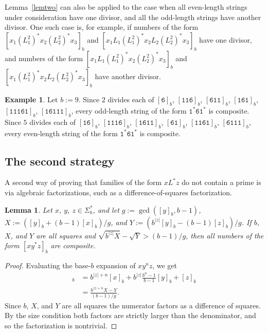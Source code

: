 \documentclass[12pt]{article}
\theoremstyle{plain}
\newtheorem{lemma}[theorem]{Lemma}
\theoremstyle{definition}
\newtheorem{example}[theorem]{Example}
\theoremstyle{remark}
\newcommand{\0}{\mathtt{0}}
\newcommand{\1}{\mathtt{1}}
\newcommand{\2}{\mathtt{2}}
\newcommand{\3}{\mathtt{3}}
\newcommand{\4}{\mathtt{4}}
\newcommand{\5}{\mathtt{5}}
\newcommand{\6}{\mathtt{6}}
\newcommand{\7}{\mathtt{7}}
\newcommand{\8}{\mathtt{8}}
\newcommand{\9}{\mathtt{9}}
\begin{document}
Lemma~\ref{lemtwo} can also be applied to the case when all even-length 
strings under consideration have one divisor, and all the odd-length 
strings have another divisor.  One such case is, for example,
if numbers of the form 
$[x_1(L_1^2)^*x_2(L_2^2)^*x_3]_b$ and $[x_1 L_1(L_1^2)^*x_2L_2(L_2^2)^*x_3]_b$ 
have one divisor, and numbers of the form $[x_1L_1(L_1^2)^*x_2(L_2^2)^*x_3]_b$ 
and $[x_1(L_1^2)^*x_2L_2(L_2^2)^*x_3]_b$ have another divisor.
\begin{example}
Let $b := 9$.
Since $2$ divides each of $[\6]_b$,
$[\1\1\6]_b$,
$[\6\1\1]_b$,
$[\1\6\1]_b$,
$[\1\1\1\6\1]_b$, 
$[\1\6\1\1\1]_b$, every odd-length string of the form $\1^*\6\1^*$ is 
composite.
Since $5$ divides each of $[\1\6]_b$,
$[\1\1\1\6]_b$,
$[\1\6\1\1]_b$,
$[\6\1]_b$,
$[\1\1\6\1]_b$, 
$[\6\1\1\1]_b$,
every even-length string of the form $\1^*\6\1^*$ is composite.
\end{example}

\subsection{The second strategy}

A second way of proving that families of the form $xL^*z$ do not contain a 
prime is via algebraic factorizations, such as a difference-of-squares 
factorization.

\begin{lemma}\label{lemsquares}
Let $x$, $y$, $z\in\Sigma^*_b$, and let $g:=\gcd([y]_b,b-1)$, 
$X:=([y]_b+(b-1)[x]_b)/g$, and $Y:=(b^{\lvert{z}\rvert}[y]_b-(b-1)[z]_b)/g$.
If\/ $b$, $X$, and $Y$ are all squares and 
$\sqrt{b^{\lvert z\rvert}X}-\sqrt{Y}>(b-1)/g$, then all numbers of the form
 $[xy^*z]_b$ are composite.
\end{lemma}
\begin{proof}
Evaluating the base-$b$ expansion of $xy^nz$, we get
\begin{align*}
[xy^nz]_b &= b^{\lvert z\rvert+n}[x]_b + b^{\lvert z\rvert}\frac{b^n-1}{b-1}[y]_b + [z]_b \\
&= \frac{b^{\lvert z\rvert+n}X-Y}{(b-1)/g} . 
\end{align*}
Since $b$, $X$, and $Y$ are all squares the numerator factors as a 
difference of squares.  By the size condition both factors are 
strictly larger than the
denominator, and so the factorization is nontrivial.
\end{proof}
\end{document}
